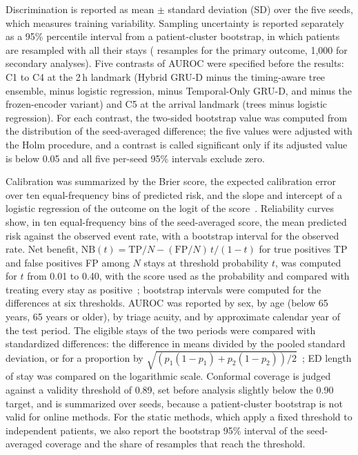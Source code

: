 Discrimination is reported as mean $\pm$ standard deviation (SD) over the five seeds, which measures training variability. Sampling uncertainty is reported
separately as a 95\% percentile interval from a patient-cluster bootstrap, in which patients are resampled with all their stays (\RVBootMain{} resamples for the
primary outcome, 1,000 for secondary analyses). Five contrasts of AUROC were specified before the results: C1 to C4 at the 2\,h landmark (Hybrid GRU-D minus the timing-aware tree
ensemble, minus logistic regression, minus Temporal-Only GRU-D, and minus the frozen-encoder variant) and C5 at the arrival landmark (trees minus logistic regression). For each contrast, the two-sided bootstrap value was computed from the distribution of the seed-averaged difference; the five values were adjusted with the Holm procedure, and a contrast is called significant only if its adjusted value is below 0.05 and all five per-seed 95\% intervals exclude zero.

Calibration was summarized by the Brier score, the expected calibration error over ten equal-frequency bins of predicted risk, and the slope and intercept of a
logistic regression of the outcome on the logit of the score~\cite{vancalster2019calibration}. Reliability curves show, in ten equal-frequency bins of the
seed-averaged score, the mean predicted risk against the observed event rate, with a bootstrap interval for the observed rate. Net benefit,
$\mathrm{NB}(t) = \mathrm{TP}/N - (\mathrm{FP}/N)\,t/(1-t)$ for true positives TP and false positives FP among $N$ stays at threshold probability $t$, was computed
for $t$ from 0.01 to 0.40, with the score used as the probability and compared with treating every stay as positive~\cite{vickers2006decisioncurve}; bootstrap
intervals were computed for the differences at six thresholds. AUROC was reported by sex, by age (below 65 years, 65 years or older), by triage acuity, and by approximate
calendar year of the test period. The eligible stays of the two periods were compared with standardized differences: the difference in means divided by the pooled
standard deviation, or for a proportion by $\sqrt{(p_1(1-p_1)+p_2(1-p_2))/2}$~\cite{austin2009balance}; ED length of stay was compared on the logarithmic scale.
Conformal coverage is judged against a validity threshold of 0.89, set before analysis slightly below the 0.90 target, and is summarized over seeds, because a
patient-cluster bootstrap is not valid for online methods. For the static methods, which apply a fixed threshold to independent patients, we also report the bootstrap 95\% interval of the seed-averaged coverage and the share of resamples that reach the threshold.

